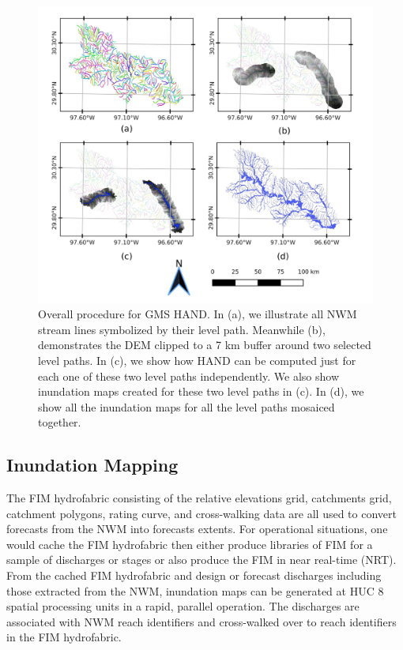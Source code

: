 \begin{figure}[h!]
\centering
\includegraphics[scale=1.0]{figures/gms_methods.jpg}
\caption{Overall procedure for GMS HAND.
In (a), we illustrate all NWM stream lines symbolized by their level path.
Meanwhile (b), demonstrates the DEM clipped to a 7 km buffer around two selected level paths.
In (c), we show how HAND can be computed just for each one of these two level paths independently. 
We also show inundation maps created for these two level paths in (c). 
In (d), we show all the inundation maps for all the level paths mosaiced together. }
\label{fig:gms_methods}
\end{figure}
%
\subsection{Inundation Mapping}
\label{ssec:inundation_mapping}
%
The FIM hydrofabric consisting of the relative elevations grid, catchments grid, catchment polygons, rating curve, and cross-walking data are all used to convert forecasts from the NWM into forecasts extents.
For operational situations, one would cache the FIM hydrofabric then either produce libraries of FIM for a sample of discharges or stages or also produce the FIM in near real-time (NRT).
From the cached FIM hydrofabric and design or forecast discharges including those extracted from the NWM, inundation maps can be generated at HUC 8 spatial processing units in a rapid, parallel operation. 
The discharges are associated with NWM reach identifiers and cross-walked over to reach identifiers in the FIM hydrofabric.


